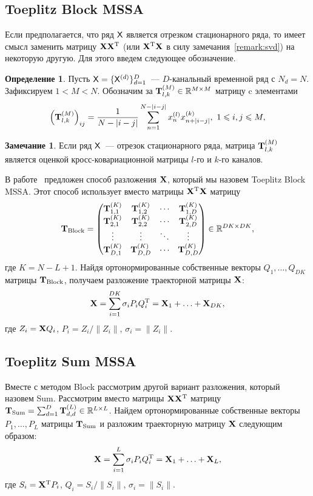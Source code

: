 \documentclass[specialist,
substylefile = spbu.rtx,
               subf,href,colorlinks=true, 12pt]{disser}
\theoremstyle{definition}
\newtheorem{definition}{Определение}
\newtheorem{remark}{Замечание}
\newcommand{\R}{\mathbb{R}}
\begin{document}
\subsection{Toeplitz Block MSSA}\label{sect:block}
Если предполагается, что ряд $\mathsf{X}$ является отрезком стационарного ряда, то имеет смысл заменить матрицу $\mathbf{X}\mathbf{X}^{\mathrm{T}}$ (или $\mathbf{X}^{\mathrm{T}}\mathbf{X}$ в силу замечания~\ref{remark:svd}) на некоторую другую. Для этого введем следующее обозначение.
\begin{definition}
	Пусть $\mathsf{X}=\{\mathsf{X}^{(d)}\}_{d=1}^D$~--- $D$-канальный временной ряд с $N_d=N$. Зафиксируем $1<M<N$. Обозначим за $\bfT_{l,k}^{(M)}\in \R^{M\times M}$ матрицу c элементами
	\begin{equation*}\label{eq:block_elements}
		\left(\mathbf{T}^{(M)}_{l,k}\right)_{ij}=\frac{1}{N-|i-j|}\sum_{n=1}^{N-|i-j|} x^{(l)}_nx^{(k)}_{n+|i-j|},\ 1\leqslant i,j\leqslant M,
	\end{equation*}
\end{definition}
\begin{remark}
	Если ряд $\mathsf{X}$~--- отрезок стационарного ряда, матрица $\mathbf{T}_{l,k}^{(M)}$ является оценкой кросс-ковариационной матрицы $l$-го и $k$-го каналов.
\end{remark}
В работе~\cite{Plaut1994} предложен способ разложения $\mathbf{X}$, который мы назовем Toeplitz Block MSSA. Этот способ использует вместо матрицы $\mathbf{X}^{\mathrm{T}}\mathbf{X}$ матрицу $$\bfT_{\text{Block}}=\begin{pmatrix}
	\bfT^{(K)}_{1,1} & \bfT^{(K)}_{1,2} & \cdots & \bfT^{(K)}_{1,D} \\
	\bfT^{(K)}_{2,1} & \bfT^{(K)}_{2,2} & \cdots & \bfT^{(K)}_{2,D} \\
	\vdots           & \vdots           & \ddots & \vdots           \\
	\bfT^{(K)}_{D,1} & \bfT^{(K)}_{D,D} & \cdots & \bfT^{(K)}_{D,D}
\end{pmatrix} \in \R^{DK\times DK},$$ где $K = N - L + 1$. Найдя ортонормированные собственные векторы $Q_1,\ldots,Q_{DK}$ матрицы $\mathbf{T}_\text{Block}$, получаем разложение траекторной матрицы $\mathbf{X}$:
\begin{equation}\label{eq:block_decomposition}
	\mathbf{X}=\sum_{i=1}^{DK} \sigma_i P_i Q_i^{\mathrm{T}}=\mathbf{X}_1+\ldots+\mathbf{X}_{DK},
\end{equation}
где $Z_i=\mathbf{X} Q_i$, $P_i=Z_i/\|Z_i\|$, $\sigma_i=\|Z_i\|$.

\subsection{Toeplitz Sum MSSA}\label{sect:sum}
Вместе с методом Block рассмотрим другой вариант разложения, который назовем Sum. Рассмотрим вместо матрицы $\mathbf{X}\mathbf{X}^{\mathrm{T}}$ матрицу $\bfT_{\text{Sum}}=\sum_{d=1}^D \bfT_{d,d}^{(L)}\in\R^{L\times L}$. Найдем ортонормированные собственные векторы $P_1,\ldots,P_L$ матрицы $\mathbf{T}_{\text{Sum}}$ и разложим траекторную матрицу $\mathbf{X}$ следующим образом:
\begin{equation}\label{eq:sum_decomposition}
	\mathbf{X}=\sum_{i=1}^L\sigma_i P_iQ_i^{\mathrm{T}}=\mathbf{X}_1+\ldots+\mathbf{X}_L,
\end{equation}
где $S_i=\mathbf{X}^{\mathrm{T}} P_i$, $Q_i=S_i/\|S_i\|$, $\sigma_i=\|S_i\|$.
\end{document}
